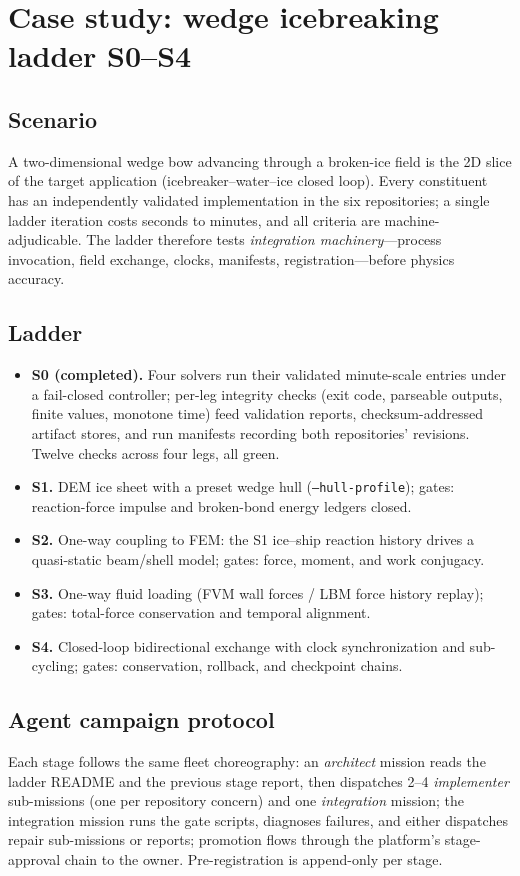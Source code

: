 \section{Case study: wedge icebreaking ladder S0--S4}\label{sec:case}

\subsection{Scenario}
A two-dimensional wedge bow advancing through a broken-ice field is the
2D slice of the target application (icebreaker--water--ice closed loop).
Every constituent has an independently validated implementation in the
six repositories; a single ladder iteration costs seconds to minutes,
and all criteria are machine-adjudicable. The ladder therefore tests
\emph{integration machinery}---process invocation, field exchange,
clocks, manifests, registration---before physics accuracy.

\subsection{Ladder}
\begin{itemize}
\item \textbf{S0 (completed).} Four solvers run their validated
minute-scale entries under a fail-closed controller; per-leg integrity
checks (exit code, parseable outputs, finite values, monotone time)
feed validation reports, checksum-addressed artifact stores, and run
manifests recording both repositories' revisions. Twelve checks across
four legs, all green.
\item \textbf{S1.} DEM ice sheet with a preset wedge hull
(\texttt{--hull-profile}); gates: reaction-force impulse and
broken-bond energy ledgers closed.
\item \textbf{S2.} One-way coupling to FEM: the S1 ice--ship reaction
history drives a quasi-static beam/shell model; gates: force, moment,
and work conjugacy.
\item \textbf{S3.} One-way fluid loading (FVM wall forces / LBM force
history replay); gates: total-force conservation and temporal
alignment.
\item \textbf{S4.} Closed-loop bidirectional exchange with clock
synchronization and sub-cycling; gates: conservation, rollback, and
checkpoint chains.
\end{itemize}

\subsection{Agent campaign protocol}
Each stage follows the same fleet choreography: an \textit{architect}
mission reads the ladder README and the previous stage report, then
dispatches 2--4 \textit{implementer} sub-missions (one per repository
concern) and one \textit{integration} mission; the integration mission
runs the gate scripts, diagnoses failures, and either dispatches repair
sub-missions or reports; promotion flows through the platform's
stage-approval chain to the owner. Pre-registration is append-only per
stage. 
